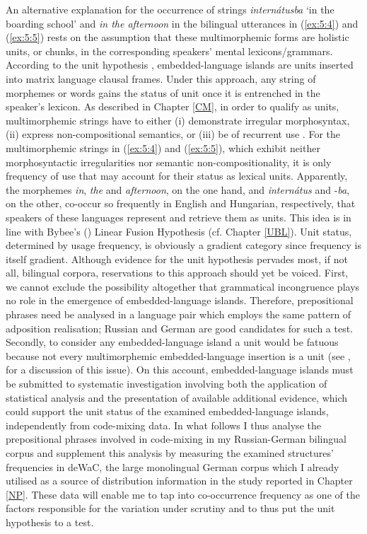 An alternative explanation for the occurrence of strings \textit{internátusba} `in the boarding school' and \textit{in the afternoon} in the bilingual utterances in (\ref{ex:5:4}) and (\ref{ex:5:5}) rests on the assumption that these multimorphemic forms are holistic units, or chunks, in the corresponding speakers' mental lexicons/grammars. According to the unit hypothesis \citep{backus-evidence-1999,backus-units-2003}, embedded-language islands are units inserted into matrix language clausal frames. Under this approach, any string of morphemes or words gains the status of unit once it is entrenched in the speaker's lexicon. As described in Chapter \ref{CM}, in order to qualify as units, multimorphemic strings have to either (i) demonstrate irregular morphosyntax, (ii) express non-compositional semantics, or (iii) be of recurrent use \citep[90]{backus-units-2003}. For the multimorphemic strings in (\ref{ex:5:4}) and (\ref{ex:5:5}), which exhibit neither morphosyntactic irregularities nor semantic non-compositionality, it is only frequency of use that may account for their status as lexical units. Apparently, the morphemes \textit{in}, \textit{the} and \textit{afternoon}, on the one hand, and \textit{internátus} and -\textit{ba}, on the other, co-occur so frequently in English and Hungarian, respectively, that speakers of these languages represent and retrieve them as units. This idea is in line with Bybee's (\citeyear{bybee-constituency-2002}) Linear Fusion Hypothesis (cf. Chapter \ref{UBL}). Unit status, determined by usage frequency, is obviously a gradient category since frequency is itself gradient. Although evidence for the unit hypothesis pervades most, if not all, bilingual corpora, reservations to this approach should yet be voiced. First, we cannot exclude the possibility altogether that grammatical incongruence plays no role in the emergence of embedded-language islands. Therefore, prepositional phrases need be analysed in a language pair which employs the same pattern of adposition realisation; Russian and German are good candidates for such a test. Secondly, to consider any embedded-language island a unit would be fatuous because not every multimorphemic embedded-language insertion is a unit (see , for a discussion of this issue). On this account, embedded-language islands must be submitted to systematic investigation involving both the application of statistical analysis and the presentation of available additional evidence, which could support the unit status of the examined embedded-language islands, independently from code-mixing data. In what follows I thus analyse the prepositional phrases involved in code-mixing in my Russian-German bilingual corpus and supplement this analysis by measuring the  examined structures’ frequencies in deWaC, the large monolingual German corpus \citep{baroni2006} which I already utilised as a source of distribution information in the study reported in Chapter \ref{NP}. These data will enable me to tap into co-occurrence frequency as one of the factors responsible for the variation under scrutiny and to thus put the unit hypothesis to a test.

